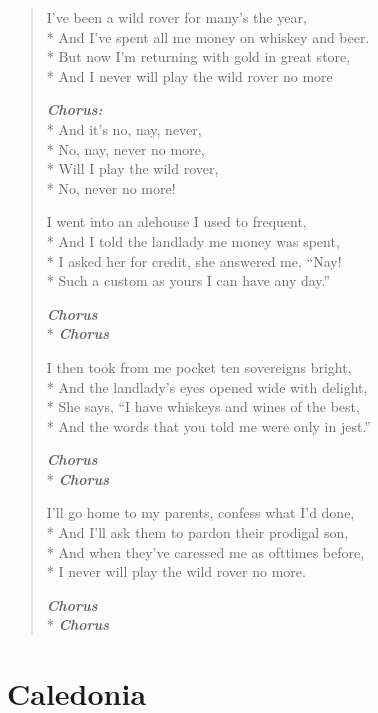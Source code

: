 \documentclass[9pt,twoside]{extarticle}
\makeatletter
\newenvironment{xverse}{
	\begin{verse}
	\fontsize{8.5}{10.5}\selectfont
}{
	\end{verse}
}
\newcommand{\chorusdef}{\textbf{\emph{Chorus:}}\\*}
\newcommand{\chorus@mark}[1][1]{%
\textbf{\emph{Chorus \ifthenelse{\equal{#1}{1}}{}{$\times$ #1}}}%
}
\newcommand{\chorusmark}[1][1]{%
\ifvmode%
\vspace{-0.5\stanzaskip}%
\chorus@mark[#1]%
\vspace{-0.5\stanzaskip}%
\else \\*%
\chorus@mark[#1]%
\fi%
}
\makeatother
\begin{document}
\begin{xverse}
I’ve been a wild rover for many’s the year, \\*
And I’ve spent all me money on whiskey and beer. \\*
But now I’m returning with gold in great store, \\*
And I never will play the wild rover no more

\chorusdef
And it’s no, nay, never, \\*
No, nay, never no more, \\*
Will I play the wild rover, \\*
No, never no more!

I went into an alehouse I used to frequent, \\*
And I told the landlady me money was spent, \\*
I asked her for credit, she answered me, “Nay! \\*
Such a custom as yours I can have any day.”

\chorusmark

I then took from me pocket ten sovereigns bright, \\*
And the landlady’s eyes opened wide with delight, \\*
She says, “I have whiskeys and wines of the best, \\*
And the words that you told me were only in jest.”

\chorusmark

I’ll go home to my parents, confess what I’d done, \\*
And I’ll ask them to pardon their prodigal son, \\*
And when they’ve caressed me as ofttimes before, \\*
I never will play the wild rover no more.

\chorusmark[2]
\end{xverse}

\section{Caledonia}
\end{document}
